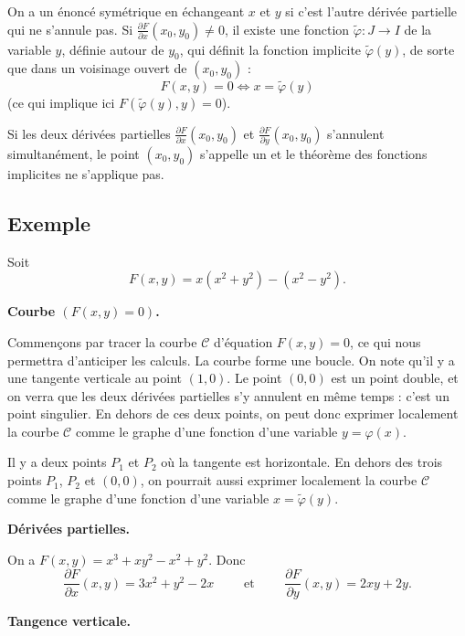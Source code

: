 \documentclass[11pt, class=report,crop=false]{standalone}
\begin{document}
On a un énoncé symétrique en échangeant $x$ et $y$ si c'est l'autre dérivée partielle qui ne s'annule pas.
Si $\frac{\partial F}{\partial x}(x_0,y_0) \neq 0$, 
il existe une fonction $\tilde\varphi : J \to I$ 
de la variable $y$, définie autour de $y_0$, qui définit la fonction implicite $\tilde\varphi(y)$, de sorte que dans un voisinage ouvert de $(x_0,y_0)$ :
$$F(x,y) = 0 \iff x = \tilde\varphi(y)$$
(ce qui implique ici $F(\tilde\varphi(y),y)=0$).



Si les deux dérivées partielles $\frac{\partial F}{\partial x}(x_0,y_0)$ et $\frac{\partial F}{\partial y}(x_0,y_0)$ s'annulent simultanément, le point $(x_0,y_0)$ s'appelle un  et le théorème des fonctions implicites ne s'applique pas.

\subsection{Exemple}

Soit 
$$F(x,y) = x(x^2+y^2)-(x^2-y^2).$$

\textbf{Courbe $(F(x,y)=0)$.}

Commençons par tracer la courbe $\mathcal{C}$ d'équation $F(x,y)=0$, ce qui nous permettra d'anticiper les calculs.
La courbe forme une boucle. On note qu'il y a une tangente verticale au point $(1,0)$.
Le point $(0,0)$ est un point double, et on verra que les deux dérivées partielles s'y annulent en même temps : c'est un point singulier. En dehors de ces deux points, on peut donc exprimer localement la courbe $\mathcal{C}$ comme le graphe d'une fonction d'une variable $y = \varphi(x)$.




Il y a deux points $P_1$ et $P_2$ où la tangente est horizontale. En dehors des trois points $P_1$, $P_2$ et $(0,0)$, on pourrait aussi exprimer localement la courbe $\mathcal{C}$ comme le graphe d'une fonction d'une variable $x = \tilde\varphi(y)$.

\bigskip

\textbf{Dérivées partielles.}

On a $F(x,y) = x^3 + xy^2 -x^2+y^2$. Donc
$$\frac{\partial F}{\partial x}(x,y) = 3x^2+y^2-2x 
\qquad \text{ et } \qquad 
\frac{\partial F}{\partial y}(x,y) = 2xy+2y.$$

\bigskip

\textbf{Tangence verticale.}
\end{document}
